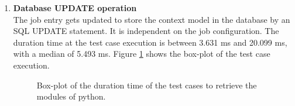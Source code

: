 \documentclass[draft,final]{vutinfth} %
\begin{document}
\begin{enumerate}
	\item \textbf{Database UPDATE operation} \\
	The job entry gets updated to store the context model in the database by an SQL UPDATE statement. It is independent on the job configuration. The duration time at the test case execution is between 3.631 ms and 20.099 ms, with a median of 5.493 ms. Figure \ref{fig:evaluation_perf_database} shows the box-plot of the test case execution. 
	
	\begin{figure}[!h]
		\centering
		\caption{Box-plot of the duration time of the test cases to retrieve the modules of python.}
		\label{fig:evaluation_perf_database}		
	\end{figure}
	
\end{enumerate}
\end{document}
